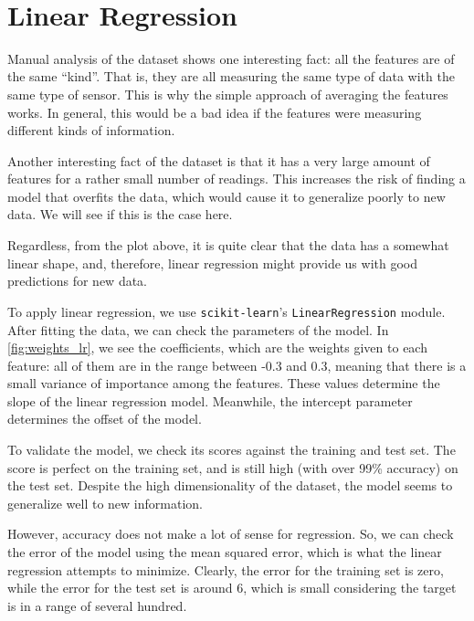 \documentclass[11pt]{article}
\begin{document}
    { \hspace*{\fill} \\}
    
    \hypertarget{linear-regression}{%
\section{Linear Regression}\label{linear-regression}}

Manual analysis of the dataset shows one interesting fact: all the
features are of the same ``kind''. That is, they are all measuring the
same type of data with the same type of sensor. This is why the simple
approach of averaging the features works. In general, this would be a
bad idea if the features were measuring different kinds of information.

Another interesting fact of the dataset is that it has a very large
amount of features for a rather small number of readings. This increases
the risk of finding a model that overfits the data, which would cause it
to generalize poorly to new data. We will see if this is the case here.

Regardless, from the plot above, it is quite clear that the data has a
somewhat linear shape, and, therefore, linear regression might provide
us with good predictions for new data.

To apply linear regression, we use \texttt{scikit-learn}'s
\texttt{LinearRegression} module. After fitting the data, we can check
the parameters of the model. In \autoref{fig:weights_lr}, we see the coefficients, which
are the weights given to each feature: all of them are in the range
between -0.3 and 0.3, meaning that there is a small variance of
importance among the features. These values determine the slope of the
linear regression model. Meanwhile, the intercept parameter determines
the offset of the model.

To validate the model, we check its scores against the training and test
set. The score is perfect on the training set, and is still high (with
over 99\% accuracy) on the test set. Despite the high dimensionality of
the dataset, the model seems to generalize well to new information.

However, accuracy does not make a lot of sense for regression. So, we
can check the error of the model using the mean squared error, which is
what the linear regression attempts to minimize. Clearly, the error for
the training set is zero, while the error for the test set is around 6,
which is small considering the target is in a range of several hundred.
\end{document}
